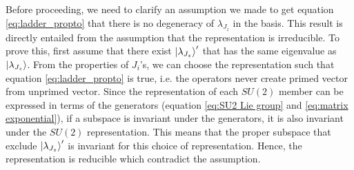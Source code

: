 \documentclass[preprint, 12pt]{revtex4-2}
\numberwithin{equation}{section}
\begin{document}
Before proceeding, we need to clarify an assumption we made to get equation \ref{eq:ladder_propto} that there is no degeneracy of $\lambda_{J_z}$ in the basis. This result is directly entailed from the assumption that the representation is irreducible. To prove this, first assume that there exist $\ket{\lambda_{J_z}}'$ that has the same eigenvalue as $\ket{\lambda_{J_z}}$. From the properties of $J_i$'s, we can choose the representation such that equation \ref{eq:ladder_propto} is true, i.e. the operators never create primed vector from unprimed vector. Since the representation of each $SU(2)$ member can be expressed in terms of the generators (equation \ref{eq:SU2 Lie group} and \ref{eq:matrix exponential}), if a subspace is invariant under the generators, it is also invariant under the $SU(2)$ representation. This means that the proper subspace that exclude $\ket{\lambda_{J_z}}'$ is invariant for this choice of representation. Hence, the representation is reducible which contradict the assumption.
\end{document}
